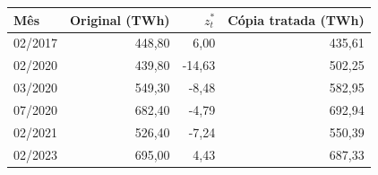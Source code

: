 \begin{tabular}{lrrr}
\toprule
Mês & Original (TWh) & $z_t^*$ & Cópia tratada (TWh) \\
\midrule
02/2017 & 448,80 & 6,00 & 435,61 \\
02/2020 & 439,80 & -14,63 & 502,25 \\
03/2020 & 549,30 & -8,48 & 582,95 \\
07/2020 & 682,40 & -4,79 & 692,94 \\
02/2021 & 526,40 & -7,24 & 550,39 \\
02/2023 & 695,00 & 4,43 & 687,33 \\
\bottomrule
\end{tabular}
